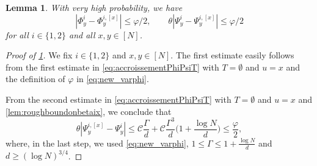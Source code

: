 \documentclass[11pt]{article}
\newcommand{\abs}[1]{\left| #1 \right|}
\theoremstyle{plain}
\newtheorem{lemma}{Lemma}[section]
\theoremstyle{remark}
\numberwithin{equation}{section}
\newcommand*\bset[1]{[#1]}
\begin{document}
	\begin{lemma}\label{lem:boundthetabsetxvarphi}
		With very high probability, we have
		\begin{equation}\label{eq:accroissementvarphia}
			\abs{\Phi_{y}^{i} - \Phi_{y}^{i,\bset{x}}} \le \varphi/2, \qquad  \theta\abs{\Psi_{y}^{i} - \Psi_{y}^{i,\bset{x}}} \le \varphi/2
		\end{equation}
		for all $i \in \{1,2\}$ and all $x,y \in [N]$.
	\end{lemma}
	
	
	\begin{proof}[Proof of \cref{lem:boundthetabsetxvarphi}]
		We fix $i \in \{1,2\}$ and $x,y \in [N]$. 
	 The first estimate easily follows from the first estimate in 
		\cref{eq:accroissementPhiPsiT} with $T= \emptyset$ and $u=x$ and the definition of $\varphi$ in \cref{eq:new_varphi}. 
		
		From the second estimate in \cref{eq:accroissementPhiPsiT} with $T= \emptyset$ and $u=x$ and \cref{lem:roughboundonbetaix}, we conclude that 
		\[ 
		\theta \abs{\Psi_{y}^{i,\bset{x}} - \Psi_{y}^{i}} \le \mathcal{C}  \frac{\Gamma}{d} + \mathcal C  \frac{\Gamma^3}{d} \bigg( 1 + \frac{ \log N}{d} \bigg)  \leq \frac{\varphi}{2}, 		\] 
		where, in the last step, we used \cref{eq:new_varphi}, $1 \leq \Gamma \leq 1 + \frac{\log N}{d}$ and $d \geq (\log N)^{3/4}$.  
	\end{proof}
\end{document}
